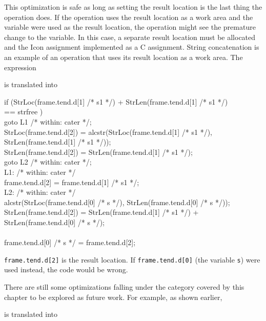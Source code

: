 This optimization is safe as long as setting the result location is
the last thing the operation does. If the operation uses the result
location as a work area and the variable were used as the result
location, the operation might see the premature change to the
variable. In this case, a separate result location must be allocated
and the Icon assignment implemented as a C assignment. String
concatenation is an example of an operation that uses its result
location as a work area. The expression


\noindent is translated into 

\goodbreak
\begin{iconcode}
\>if (StrLoc(frame.tend.d[1] /* s1 */) + StrLen(frame.tend.d[1] /* s1 */)\\
\>\>== strfree )\\
\>\>goto L1 /* within: cater */;\\
\>StrLoc(frame.tend.d[2]) = alcstr(StrLoc(frame.tend.d[1] /* s1 */),\\
\>\>StrLen(frame.tend.d[1] /* s1 */));\\
\>StrLen(frame.tend.d[2]) = StrLen(frame.tend.d[1] /* s1 */);\\
\>goto L2 /* within: cater */;\\
L1: /* within: cater */\\
\>frame.tend.d[2] = frame.tend.d[1] /* s1 */;\\
L2: /* within: cater */\\
\>alcstr(StrLoc(frame.tend.d[0] /* s */), StrLen(frame.tend.d[0] /* s */));\\
\>StrLen(frame.tend.d[2]) = StrLen(frame.tend.d[1] /* s1 */) +\\
\>\>StrLen(frame.tend.d[0] /* s */);\\
\\
\>frame.tend.d[0] /* s */ = frame.tend.d[2];\\
\end{iconcode}


\noindent \texttt{frame.tend.d[2]} is the result location. If
\texttt{frame.tend.d[0]} (the variable \texttt{s}) were used instead,
the code would be wrong.


There are still some optimizations falling under the category covered
by this chapter to be explored as future work. For example, as shown
earlier,


\noindent is translated into

